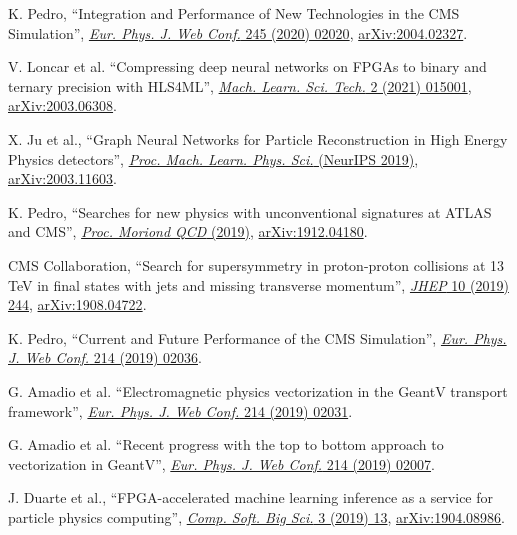 \begin{description}[leftmargin=12pt,font=\normalfont,labelsep=0em]
\item K. Pedro, ``Integration and Performance of New Technologies in the CMS Simulation'', \href{https://doi.org/10.1051/epjconf/202024502020}{\emph{Eur. Phys. J. Web Conf.} 245 (2020) 02020}, \href{https://arxiv.org/abs/2004.02327}{arXiv:2004.02327}. %
\item V. Loncar et al. ``Compressing deep neural networks on FPGAs to binary and ternary precision with HLS4ML'', \href{https://doi.org/10.1088/2632-2153/aba042}{\emph{Mach. Learn. Sci. Tech.} 2 (2021) 015001}, \href{https://arxiv.org/abs/2003.06308}{arXiv:2003.06308}. %
\item X. Ju et al., ``Graph Neural Networks for Particle Reconstruction in High Energy Physics detectors'', \href{https://ml4physicalsciences.github.io/2019/#papers}{\emph{Proc. Mach. Learn. Phys. Sci.} (NeurIPS 2019)}, \href{https://arxiv.org/abs/2003.11603}{arXiv:2003.11603}. %
\item K. Pedro, ``Searches for new physics with unconventional signatures at ATLAS and CMS'', \href{http://moriond.in2p3.fr/previous-sessions.html}{\emph{Proc. Moriond QCD} (2019)}, \href{https://arxiv.org/abs/1912.04180}{arXiv:1912.04180}. %
\item CMS Collaboration, ``Search for supersymmetry in proton-proton collisions at 13 TeV in final states with jets and missing transverse momentum'', \href{http://dx.doi.org/10.1007/JHEP10(2019)244}{\emph{JHEP} 10 (2019) 244}, \href{https://arxiv.org/abs/1908.04722}{arXiv:1908.04722}. %
\item K. Pedro, ``Current and Future Performance of the CMS Simulation'', \href{https://doi.org/10.1051/epjconf/201921402036}{\emph{Eur. Phys. J. Web Conf.} 214 (2019) 02036}. %
\item G. Amadio et al. ``Electromagnetic physics vectorization in the GeantV transport framework'', \href{https://doi.org/10.1051/epjconf/201921402031}{\emph{Eur. Phys. J. Web Conf.} 214 (2019) 02031}. %
\item G. Amadio et al. ``Recent progress with the top to bottom approach to vectorization in GeantV'', \href{https://doi.org/10.1051/epjconf/201921402007}{\emph{Eur. Phys. J. Web Conf.} 214 (2019) 02007}. %
\item \begin{sloppypar}J. Duarte et al., ``FPGA-accelerated machine learning inference as a service for particle physics computing'', \href{https://doi.org/10.1007/s41781-019-0027-2}{\emph{Comp. Soft. Big Sci.} 3 (2019) 13}, \href{https://arxiv.org/abs/1904.08986}{arXiv:1904.08986}.\end{sloppypar} %

\end{description}
